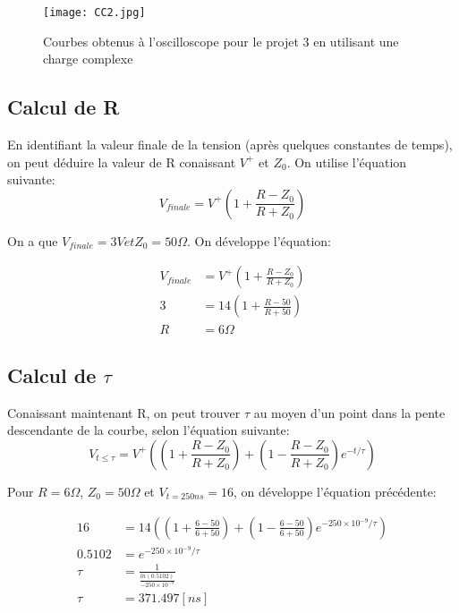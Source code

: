\begin{figure}[htb]
\begin{center}
\texttt{[image: CC2.jpg]}
\caption{Courbes obtenus à l'oscilloscope pour le projet 3 en utilisant une charge complexe}
\label{CC2}
\end{center}
\end{figure}

\subsection*{Calcul de R}
En identifiant la valeur finale de la tension (après quelques constantes de temps), on peut déduire la valeur de R conaissant $V^{+}$  et $Z_0$. On utilise l'équation suivante:
\begin{equation}
V_{finale} = V^{+} \left( 1 + \frac{R - Z_0}{R + Z_0}\right)
\end{equation}

On a que $V_{finale} = 3V et Z_0 = 50 \Omega$. On développe l'équation:

\begin{align*}
V_{finale} &= V^{+} \left( 1 + \frac{R - Z_0}{R + Z_0}\right)\\
3 &= 14 \left( 1 + \frac{R - 50}{R + 50}\right)\\
R &= 6 \Omega
\end{align*}

\subsection*{Calcul de $\tau$}

Conaissant maintenant R, on peut trouver $\tau$ au moyen d'un point dans la pente descendante de la courbe, selon l'équation suivante:
\begin{equation}
V_{t\leq \tau} = V^{+} \left( \left(1 + \frac{R - Z_0}{R + Z_0}\right) + \left(1 -\frac{R - Z_0}{R + Z_0}\right) e^{-t/\tau} \right)
\end{equation}

Pour $R=6 \Omega$, $Z_0 = 50 \Omega$ et $V_{t= 250ns} = 16$, on développe l'équation précédente:

\begin{align*}
16 &= 14 \left( \left(1 + \frac{6 - 50}{6 + 50}\right) + \left(1 -\frac{6 - 50}{6 + 50}\right) e^{-250 \times 10^{-9}/\tau} \right)\\
0.5102 &= e^{-250 \times 10^{-9}/\tau}\\
\tau   &= \frac{1}{\frac{ln(0.5102)}{-250 \times 10^{-9}}}\\
\tau   &= 371.497\left[ns\right]
\end{align*}

